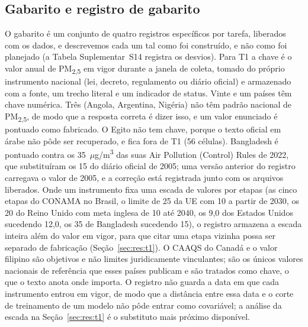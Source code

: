 \subsection{Gabarito e registro de gabarito}
\label{sec:gabarito}

O gabarito é um conjunto de quatro registros específicos por tarefa, liberados
com os dados, e descrevemos cada um tal como foi construído, e não como foi
planejado (a Tabela Suplementar~S14 registra os desvios). Para T1 a chave é o
valor anual de PM\textsubscript{2,5} em vigor durante a janela de coleta, tomado
do próprio instrumento nacional (lei, decreto, regulamento ou diário oficial) e
armazenado com a fonte, um trecho literal e um indicador de status. Vinte e um
países têm chave numérica. Três (Angola, Argentina, Nigéria) não têm padrão
nacional de PM\textsubscript{2,5}, de modo que a resposta correta é dizer isso,
e um valor enunciado é pontuado como fabricado. O Egito não tem chave, porque o
texto oficial em árabe não pôde ser recuperado, e fica fora de T1 (56 células).
Bangladesh é pontuado contra os 35~$\mu$g/m\textsuperscript{3} das suas Air
Pollution (Control) Rules de 2022, que substituíram os 15 do diário oficial de
2005; uma versão anterior do registro carregava o valor de 2005, e a correção
está registrada junto com os arquivos liberados. Onde um instrumento fixa uma
escada de valores por etapas (as cinco etapas do CONAMA no Brasil, o limite de
25 da UE com 10 a partir de 2030, os 20 do Reino Unido com meta inglesa de 10
até 2040, os 9,0 dos Estados Unidos sucedendo 12,0, os 35 de Bangladesh
sucedendo 15), o registro armazena a escada inteira além do valor em vigor,
para que citar uma etapa vizinha possa ser separado de fabricação
(Seção~\ref{sec:res:t1}). O CAAQS do Canadá e o valor filipino são objetivos e
não limites juridicamente vinculantes; são os únicos valores nacionais de
referência que esses países publicam e são tratados como chave, o que o texto
anota onde importa. O registro não guarda a data em que cada instrumento entrou
em vigor, de modo que a distância entre essa data e o corte de treinamento de
um modelo não pôde entrar como covariável; a análise da escada na
Seção~\ref{sec:res:t1} é o substituto mais próximo disponível.


